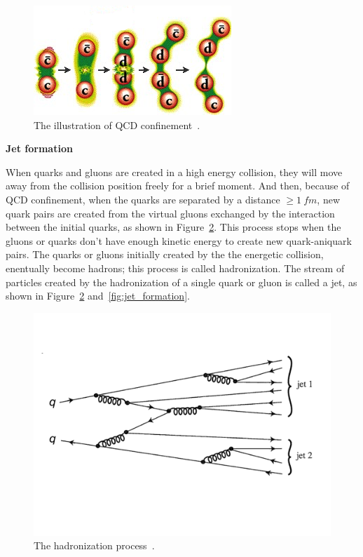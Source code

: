 \begin{figure}[htb]
\centering
\includegraphics[width=.7\textwidth]{figures/color_field.jpg}
\caption{The illustration of QCD confinement~\cite{web:qcd_confinement}.}
\label{fig:color_field}
\end{figure}  



{\bf Jet formation}

When quarks and gluons are created in a high energy collision, they will
move away from the collision position freely for a brief moment. And then,
because of QCD confinement, when the quarks are separated by a distance
${\geq} 1~fm$, new quark pairs are created from the virtual gluons exchanged by 
the interaction between the initial quarks, as shown in Figure~\ref{fig:hadronization}. 
This process stops when the gluons or quarks don't have enough kinetic energy to create new
quark-aniquark pairs. The quarks or gluons initially created by the the energetic collision,
enentually become hadrons; this process is called hadronization. The stream of particles
created by the hadronization of a single quark or gluon is called a jet, as shown in 
Figure~\ref{fig:hadronization} and~\ref{fig:jet_formation}. 


\begin{figure}[!htbp]
\centering
\includegraphics[width=.7\textwidth]{figures/jets.png}
\caption{The hadronization process~\cite{particlebook1}.}
\label{fig:hadronization}
\end{figure}  

